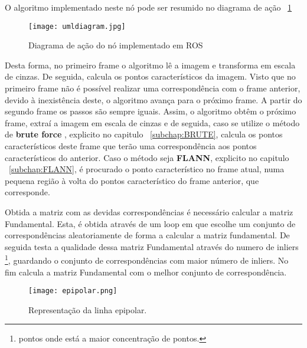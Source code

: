 	O algoritmo implementado neste nó pode ser resumido no diagrama de ação ~\ref{fig:diaguml}

	\begin{figure}[h!] %
		\begin{center}
			\leavevmode		
			\texttt{[image: umldiagram.jpg]}
			\caption{Diagrama de ação do nó implementado em ROS}
			\label{fig:diaguml}
		\end{center}
	\end{figure}


	
	Desta forma, no primeiro frame o algoritmo lê a imagem e transforma em escala de cinzas. De seguida, calcula os pontos característicos da imagem. Visto que no primeiro frame não é possível realizar uma correspondência com o frame anterior, devido à inexistência deste, o algoritmo avança para o próximo frame. A partir do segundo frame os passos são sempre iguais. Assim, o algoritmo obtêm o próximo frame, extraí a imagem em escala de cinzas e de seguida, caso se utilize o método de \textbf{brute force} , explicito no capitulo ~\ref{subchap:BRUTE}, calcula os pontos característicos deste frame que terão uma correspondência aos pontos característicos do anterior. Caso o método seja \textbf{FLANN}, explicito no capitulo ~\ref{subchap:FLANN}, é procurado o ponto característico no frame atual, numa pequena região à volta do pontos característico do frame anterior, que corresponde.
	
	Obtida a matriz com as devidas correspondências é necessário calcular a matriz Fundamental. Esta, é obtida através de um loop em que escolhe um conjunto de correspondências aleatoriamente de forma a calcular a matriz fundamental. De seguida testa a qualidade dessa matriz Fundamental através do numero de inliers \footnote{pontos onde está a maior concentração de pontos.}, guardando o conjunto de correspondências com maior número de inliers. No fim calcula a matriz Fundamental com o melhor conjunto de correspondência.
	
	
	\begin{figure}[h!] %
		\begin{center}
			\leavevmode		
			\texttt{[image: epipolar.png]}
			\caption{Representação da linha epipolar.}
			\label{fig:equ}
		\end{center}
	\end{figure}

